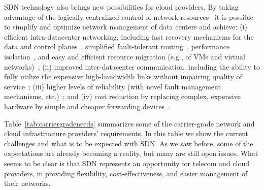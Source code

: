 SDN technology also brings new possibilities for cloud providers.
By taking advantage of the logically centralized control of network resources~\cite{hong2013,jain2013-1} it is possible to simplify and optimize network management of data centers and achieve:
(i) efficient intra-datacenter networking, including fast recovery mechanisms for the  data and control planes~\cite{sharma2013-1,staessens2011,sharma2013}, simplified fault-tolerant routing~\cite{mysore2009}, performance isolation~\cite{greenberg2009}, and easy and efficient resource migration (e.g., of VMs and virtual networks)~\cite{sharma2013-1};
(ii) improved inter-datacenter communication, including the ability to fully utilize the expensive high-bandwidth links without impairing quality of service~\cite{jain2013-1,sadasivarao2013};
(iii) higher levels of reliability (with novel fault management mechanisms, etc.)~\cite{mysore2009,sharma2013-1,staessens2011}; and 
(iv) cost reduction by replacing complex, expensive hardware by simple and cheaper forwarding devices~\cite{tanner2013,jain2013-1}.

Table~\ref{tab:carriergradeneeds} summarizes some of the carrier-grade network and cloud infrastructure providers' requirements.
In this table we show the current challenges and what is to be expected with SDN.
As we saw before, some of the expectations are already becoming a reality, but many are still open issues.
What seems to be clear is that SDN represents an opportunity for telecom and cloud providers, in providing flexibility, cost-effectiveness, and easier management of their networks.


